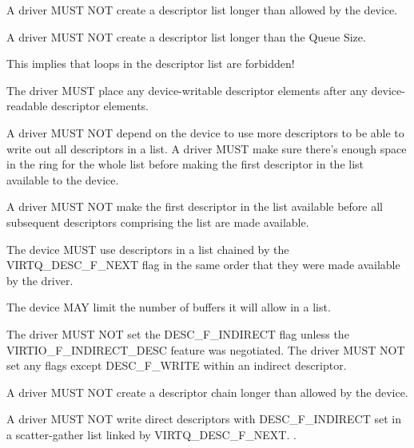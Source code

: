 A driver MUST NOT create a descriptor list longer than allowed
by the device.

A driver MUST NOT create a descriptor list longer than the Queue
Size.

This implies that loops in the descriptor list are forbidden!

The driver MUST place any device-writable descriptor elements after
any device-readable descriptor elements.

A driver MUST NOT depend on the device to use more descriptors
to be able to write out all descriptors in a list. A driver
MUST make sure there's enough space in the ring
for the whole list before making the first descriptor in the list
available to the device.

A driver MUST NOT make the first descriptor in the list available
before all subsequent descriptors comprising the list are made
available.

The device MUST use descriptors in a list chained by the
VIRTQ_DESC_F_NEXT flag in the same order that they
were made available by the driver.

The device MAY limit the number of buffers it will allow in a
list.

The driver MUST NOT set the DESC_F_INDIRECT flag unless the
VIRTIO_F_INDIRECT_DESC feature was negotiated.   The driver MUST NOT
set any flags except DESC_F_WRITE within an indirect descriptor.

A driver MUST NOT create a descriptor chain longer than allowed
by the device.

A driver MUST NOT write direct descriptors with
DESC_F_INDIRECT set in a scatter-gather list linked by
VIRTQ_DESC_F_NEXT.
.

